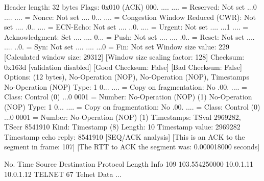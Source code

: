     Header length: 32 bytes
    Flags: 0x010 (ACK)
        000. .... .... = Reserved: Not set
        ...0 .... .... = Nonce: Not set
        .... 0... .... = Congestion Window Reduced (CWR): Not set
        .... .0.. .... = ECN-Echo: Not set
        .... ..0. .... = Urgent: Not set
        .... ...1 .... = Acknowledgment: Set
        .... .... 0... = Push: Not set
        .... .... .0.. = Reset: Not set
        .... .... ..0. = Syn: Not set
        .... .... ...0 = Fin: Not set
    Window size value: 229
    [Calculated window size: 29312]
    [Window size scaling factor: 128]
    Checksum: 0x163d [validation disabled]
        [Good Checksum: False]
        [Bad Checksum: False]
    Options: (12 bytes), No-Operation (NOP), No-Operation (NOP), Timestamps
        No-Operation (NOP)
            Type: 1
                0... .... = Copy on fragmentation: No
                .00. .... = Class: Control (0)
                ...0 0001 = Number: No-Operation (NOP) (1)
        No-Operation (NOP)
            Type: 1
                0... .... = Copy on fragmentation: No
                .00. .... = Class: Control (0)
                ...0 0001 = Number: No-Operation (NOP) (1)
        Timestamps: TSval 2969282, TSecr 8541910
            Kind: Timestamp (8)
            Length: 10
            Timestamp value: 2969282
            Timestamp echo reply: 8541910
    [SEQ/ACK analysis]
        [This is an ACK to the segment in frame: 107]
        [The RTT to ACK the segment was: 0.000018000 seconds]

No.     Time           Source                Destination           Protocol Length Info
    109 103.554250000  10.0.1.11             10.0.1.12             TELNET   67     Telnet Data ...

